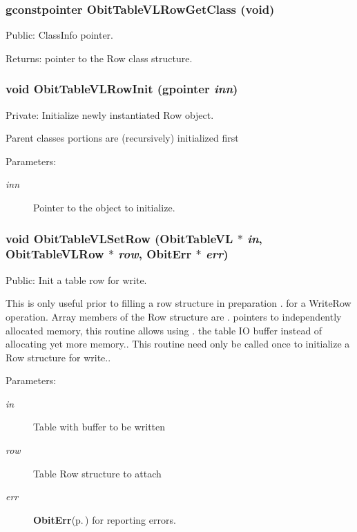 \subsubsection{\setlength{\rightskip}{0pt plus 5cm}gconstpointer Obit\-Table\-VLRow\-Get\-Class (void)}\label{ObitTableVL_8c_a15}


Public: Class\-Info pointer. 

\begin{Desc}
\item[Returns:]pointer to the Row class structure. \end{Desc}
\subsubsection{\setlength{\rightskip}{0pt plus 5cm}void Obit\-Table\-VLRow\-Init (gpointer {\em inn})}\label{ObitTableVL_8c_a6}


Private: Initialize newly instantiated Row object. 

Parent classes portions are (recursively) initialized first \begin{Desc}
\item[Parameters:]
\begin{description}
\item[{\em inn}]Pointer to the object to initialize. \end{description}
\end{Desc}
\subsubsection{\setlength{\rightskip}{0pt plus 5cm}void Obit\-Table\-VLSet\-Row ({\bf Obit\-Table\-VL} $\ast$ {\em in}, {\bf Obit\-Table\-VLRow} $\ast$ {\em row}, {\bf Obit\-Err} $\ast$ {\em err})}\label{ObitTableVL_8c_a23}


Public: Init a table row for write. 

This is only useful prior to filling a row structure in preparation . for a Write\-Row operation. Array members of the Row structure are . pointers to independently allocated memory, this routine allows using . the table IO buffer instead of allocating yet more memory.. This routine need only be called once to initialize a Row structure for write.. \begin{Desc}
\item[Parameters:]
\begin{description}
\item[{\em in}]Table with buffer to be written \item[{\em row}]Table Row structure to attach \item[{\em err}]{\bf Obit\-Err}{\rm (p.\,\pageref{structObitErr})} for reporting errors. \end{description}
\end{Desc}
